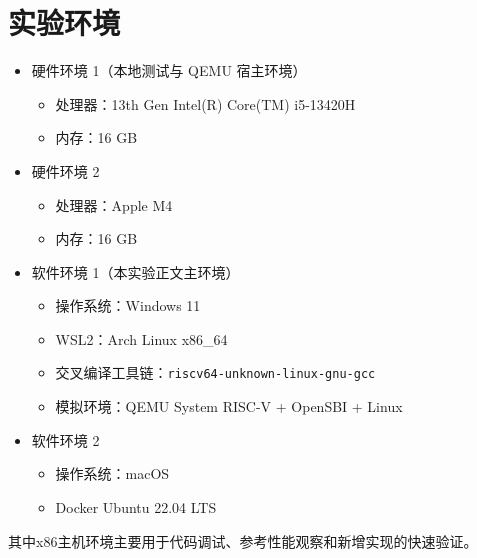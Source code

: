 \section{实验环境}

\begin{itemize}
    \item 硬件环境 1（本地测试与 QEMU 宿主环境）
    \begin{itemize}
        \item 处理器：13th Gen Intel(R) Core(TM) i5-13420H
        \item 内存：16 GB
    \end{itemize}

    \item 硬件环境 2
    \begin{itemize}
        \item 处理器：Apple M4
        \item 内存：16 GB
    \end{itemize}

    \item 软件环境 1（本实验正文主环境）
    \begin{itemize}
        \item 操作系统：Windows 11
        \item WSL2：Arch Linux x86\_64
        \item 交叉编译工具链：\verb|riscv64-unknown-linux-gnu-gcc|
        \item 模拟环境：QEMU System RISC-V + OpenSBI + Linux
    \end{itemize}

    \item 软件环境 2
    \begin{itemize}
        \item 操作系统：macOS
        \item Docker Ubuntu 22.04 LTS
    \end{itemize}
\end{itemize}

其中x86主机环境主要用于代码调试、参考性能观察和新增实现的快速验证。
